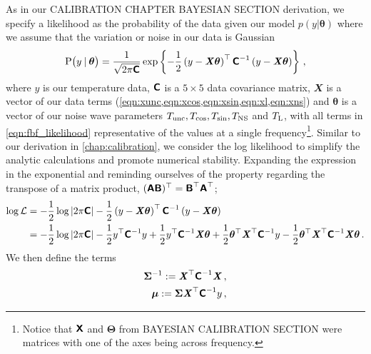 As in our CALIBRATION CHAPTER BAYESIAN SECTION derivation, we specify a likelihood as the probability of the data given our model $p( y \vert \boldsymbol{\theta} )$ where we assume that the variation or noise in our data is Gaussian
\begin{equation}
    \label{eqn:fbf_likelihood}
    \mathrm{P}\big( y \:\vert\: \boldsymbol{\theta} \big) = \frac{1}{ \sqrt{ 2 \pi \textbf{\textsf{C}} } } \exp \left\{ - \frac{1}{2} \left( y - \textbf{\textit{X}}\boldsymbol{\theta} \right)^{\top} \textbf{\textsf{C}}^{-1}  \left( y - \textbf{\textit{X}}\boldsymbol{\theta} \right) \right\} \,,
\end{equation}
where $y$ is our temperature data, $\textbf{\textsf{C}}$ is a $5 \times 5$ data covariance matrix, $\mathbfit{X}$ is a vector of our data terms (\cref{eqn:xunc,eqn:xcos,eqn:xsin,eqn:xl,eqn:xns}) and $\boldsymbol{\theta}$ is a vector of our noise wave parameters $T_{\mathrm{unc}}, T_{\mathrm{cos}}, T_{\mathrm{sin}}, T_{\mathrm{NS}}$ and $T_{\mathrm{L}}$, with all terms in \cref{eqn:fbf_likelihood} representative of the values at a single frequency\footnote{Notice that $\textbf{\textsf{X}}$ and $\boldsymbol{\Theta}$ from BAYESIAN CALIBRATION SECTION were matrices with one of the axes being across frequency.}. Similar to our derivation in \cref{chap:calibration}, we consider the log likelihood to simplify the analytic calculations and promote numerical stability. Expanding the expression in the exponential and reminding ourselves of the property regarding the transpose of a matrix product, $(\textbf{\textsf{AB}})^{\top} = \textbf{\textsf{B}}^{\top}\textbf{\textsf{A}}^{\top}$;
\begin{align}
    \log\mathcal{L} &= - \frac{1}{2} \log |2 \pi \textbf{\textsf{C}}| - \frac{1}{2} \left( y - \textbf{\textit{X}}\boldsymbol{\theta} \right)^{\top} \textbf{\textsf{C}}^{-1} \left( y - \textbf{\textit{X}}\boldsymbol{\theta} \right)
    \label{eqn:fbf_loglike} \\
    &= -\frac{1}{2} \log |2 \pi \textbf{\textsf{C}}| - \frac{1}{2} y^{\top} \textbf{\textsf{C}}^{-1} y + \frac{1}{2} y^{\top} \textbf{\textsf{C}}^{-1} \textbf{\textit{X}}\boldsymbol{\theta} + \frac{1}{2} \boldsymbol{\theta}^{\top} \textbf{\textit{X}}^{\top} \textbf{\textsf{C}}^{-1} y - \frac{1}{2} \boldsymbol{\theta}^{\top} \textbf{\textit{X}}^{\top} \textbf{\textsf{C}}^{-1} \textbf{\textit{X}} \boldsymbol{\theta} \,.
    \label{eqn:fbf_expand_loglike}
\end{align}
We then define the terms
\begin{align}
    \bm{\Sigma}^{-1} := \textbf{\textit{X}}^{\top} \textbf{\textsf{C}}^{-1} \textbf{\textit{X}} \,,
    \label{eqn:fbf_covmat} \\
    \boldsymbol{\mu} := \bm{\Sigma} \textbf{\textit{X}}^{\top} \textbf{\textsf{C}}^{-1} y \,,
    \label{eqn:fbf_mu}
\end{align}
